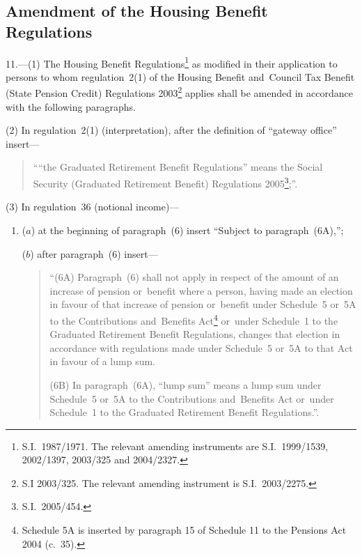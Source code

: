 \documentclass[12pt,a4paper]{article}
\begin{document}
\renewcommand\parthead{--- Part VI}

\subsection[11. Amendment of the Housing Benefit Regulations]{Amendment of the Housing Benefit Regulations}

11.---(1)  The Housing Benefit Regulations\footnote{S.I.~1987/1971. The relevant amending instruments are S.I.~1999/1539, 2002/1397, 2003/325 and 2004/2327.} as modified in their application to persons to whom regulation~2(1) of the Housing Benefit and~Council Tax Benefit (State Pension Credit) Regulations 2003\footnote{S.I 2003/325. The relevant amending instrument is S.I.~2003/2275.} applies shall be amended in accordance with the following paragraphs.

(2) In regulation~2(1) (interpretation), after the definition of “gateway office” insert—
\begin{quotation}
\begin{sloppypar}
““the Graduated Retirement Benefit Regulations” means the Social Security (Graduated Retirement Benefit) Regulations 2005\footnote{S.I.~2005/454.};”.
\end{sloppypar}
\end{quotation}

(3) In regulation~36 (notional income)—
\begin{enumerate}\item[]
\begin{sloppypar}
($a$) at the beginning of paragraph~(6) insert “Subject to paragraph~(6A),”;
\end{sloppypar}

($b$) after paragraph~(6) insert—
\begin{quotation}
“(6A) Paragraph~(6) shall not apply in respect of the amount of an increase of pension or~benefit where a person, having made an election in favour of that increase of pension or~benefit under Schedule~5 or~5A to the Contributions and~Benefits Act\footnote{Schedule 5A is inserted by paragraph 15 of Schedule 11 to the Pensions Act 2004 (c.~35).} or~under Schedule~1 to the Graduated Retirement Benefit Regulations, changes that election in accordance with regulations made under Schedule~5 or~5A to that Act in favour of a lump sum.

(6B) In paragraph~(6A), “lump sum” means a lump sum under Schedule~5 or~5A to the Contributions and~Benefits Act or~under Schedule~1 to the Graduated Retirement Benefit Regulations.”.
\end{quotation}
\end{enumerate}
\end{document}
